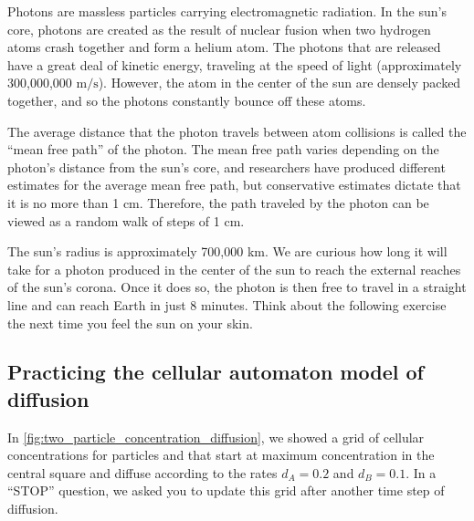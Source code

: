 Photons are massless particles carrying electromagnetic radiation. In the sun's core, photons are created as the result of nuclear fusion when two hydrogen atoms crash together and form a helium atom. The photons that are released have a great deal of kinetic energy, traveling at the speed of light (approximately 300,000,000 $\text{m}/\text{s}$). However, the atom in the center of the sun are densely packed together, and so the photons constantly bounce off these atoms.

The average distance that the photon travels between atom collisions is called the ``mean free path'' of the photon. The mean free path varies depending on the photon's distance from the sun's core, and researchers have produced different estimates for the average mean free path, but conservative estimates dictate that it is no more than 1 cm. Therefore, the path traveled by the photon can be viewed as a random walk of steps of 1 cm.\\

\begin{exercise}\end{exercise}

The sun's radius is approximately 700,000 km. We are curious how long it will take for a photon produced in the center of the sun to reach the external reaches of the sun's corona. Once it does so, the photon is then free to travel in a straight line and can reach Earth in just 8 minutes. Think about the following exercise the next time you feel the sun on your skin.\\

\begin{exercise}\end{exercise}

\subsection{Practicing the cellular automaton model of diffusion}

In \autoref{fig:two_particle_concentration_diffusion}, we showed a grid of cellular concentrations for particles  and  that start at maximum concentration in the central square and diffuse according to the rates $d_A = 0.2$ and $d_B = 0.1$. In a ``STOP'' question, we asked you to update this grid after another time step of diffusion.\\

